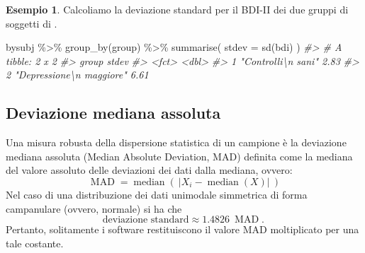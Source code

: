 \documentclass[
  10pt,
  italian,
  a4paper,
  extrafontsizes,onecolumn,openright
  ]{memoir}
\newenvironment{Shaded}{\begin{snugshade}}{\end{snugshade}}
\newcommand{\AttributeTok}[1]{\textcolor[rgb]{0.77,0.63,0.00}{#1}}
\newcommand{\CommentTok}[1]{\textcolor[rgb]{0.56,0.35,0.01}{\textit{#1}}}
\newcommand{\FunctionTok}[1]{\textcolor[rgb]{0.00,0.00,0.00}{#1}}
\newcommand{\NormalTok}[1]{#1}
\newcommand{\SpecialCharTok}[1]{\textcolor[rgb]{0.00,0.00,0.00}{#1}}
\theoremstyle{definition}
\theoremstyle{definition}
\newtheorem{example}{Esempio}[chapter]
\theoremstyle{definition}
\theoremstyle{definition}
\theoremstyle{remark}
\begin{document}
\begin{example}

Calcoliamo la deviazione standard per il BDI-II dei due gruppi di soggetti di \textcite{zetschefuture2019}.

\begin{Shaded}
\begin{Highlighting}[]
\NormalTok{bysubj }\SpecialCharTok{\%\textgreater{}\%} 
  \FunctionTok{group\_by}\NormalTok{(group) }\SpecialCharTok{\%\textgreater{}\%} 
  \FunctionTok{summarise}\NormalTok{(}
    \AttributeTok{stdev =} \FunctionTok{sd}\NormalTok{(bdi)}
\NormalTok{  ) }
\CommentTok{\#\textgreater{} \# A tibble: 2 x 2}
\CommentTok{\#\textgreater{}   group                    stdev}
\CommentTok{\#\textgreater{}   \textless{}fct\textgreater{}                    \textless{}dbl\textgreater{}}
\CommentTok{\#\textgreater{} 1 "Controlli\textbackslash{}n sani"        2.83}
\CommentTok{\#\textgreater{} 2 "Depressione\textbackslash{}n maggiore"  6.61}
\end{Highlighting}
\end{Shaded}

\end{example}

\hypertarget{deviazione-mediana-assoluta}{%
\subsection{Deviazione mediana assoluta}\label{deviazione-mediana-assoluta}}

Una misura robusta della dispersione statistica di un campione è la deviazione mediana assoluta (Median Absolute Deviation, MAD) definita come la mediana del valore assoluto delle deviazioni dei dati dalla mediana, ovvero:
\[
{\displaystyle \operatorname {MAD} =\operatorname {median} \left(\ \left|X_{i}-\operatorname {median} (X)\right|\ \right)}
\]
Nel caso di una distribuzione dei dati unimodale simmetrica di forma campanulare (ovvero, normale) si ha che
\[
{\displaystyle \text{deviazione standard} \approx 1.4826\ \operatorname {MAD} .\,}
\]
Pertanto, solitamente i software restituiscono il valore MAD moltiplicato per una tale costante.
\end{document}

